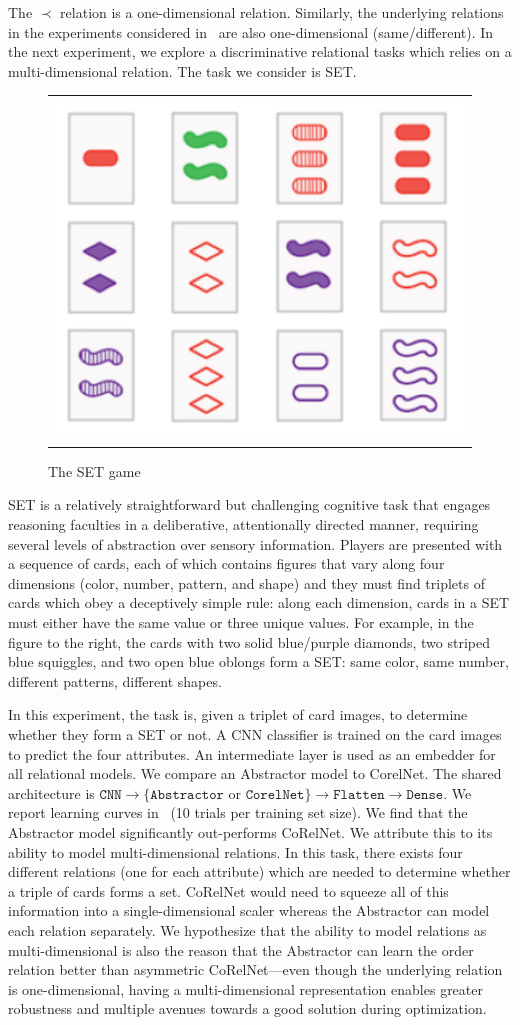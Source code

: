 The $\prec$ relation is a one-dimensional relation. Similarly, the underlying relations in the experiments considered in~\citep{kerg2022neural} are also one-dimensional (same/different). In the next experiment, we explore a discriminative relational tasks which relies on a multi-dimensional relation. The task we consider is SET. 

\begin{figure}
	\vskip-5pt
	\begin{tabular}{c}
		\includegraphics[width=.25\textwidth]{figures/set_example}\\[-5pt]
	\end{tabular}
	\caption{\footnotesize The SET game}
\end{figure}

SET is a relatively straightforward but challenging cognitive task that engages reasoning faculties in a deliberative, attentionally directed manner, requiring several levels of abstraction over sensory information. Players are presented with a sequence of cards, each of which contains figures that vary along four dimensions (color, number, pattern, and shape) and they must find triplets of cards which obey a deceptively simple rule: along each dimension, cards in a SET must either have the same value or three unique values. For example, in the figure to the right, the cards with two solid blue/purple diamonds, two striped blue squiggles, and two open blue oblongs form a SET: same color, same number, different patterns, different shapes.

In this experiment, the task is, given a triplet of card images, to determine whether they form a SET or not. A CNN classifier is trained on the card images to predict the four attributes. An intermediate layer is used as an embedder for all relational models. We compare an Abstractor model to CorelNet. The shared architecture is $\texttt{CNN} \to \{\texttt{Abstractor} \text{ or } \texttt{CorelNet}\} \to \texttt{Flatten} \to \texttt{Dense}$. We report learning curves in~ (10 trials per training set size). We find that the Abstractor model significantly out-performs CoRelNet. We attribute this to its ability to model multi-dimensional relations. In this task, there exists four different relations (one for each attribute) which are needed to determine whether a triple of cards forms a set. CoRelNet would need to squeeze all of this information into a single-dimensional scaler whereas the Abstractor can model each relation separately. We hypothesize that the ability to model relations as multi-dimensional is also the reason that the Abstractor can learn the order relation better than asymmetric CoRelNet---even though the underlying relation is one-dimensional, having a multi-dimensional representation enables greater robustness and multiple avenues towards a good solution during optimization.

